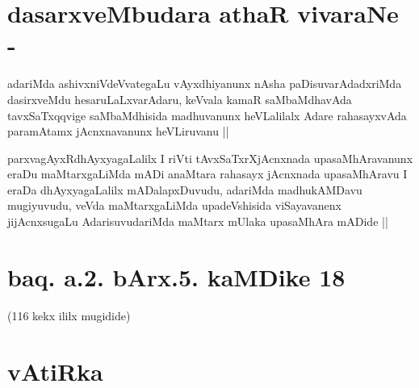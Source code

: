 \section*{dasarxveMbudara athaR vivaraNe -}

\begin{artha}
adariMda ashivxniVdeVvategaLu vAyxdhiyanunx nAsha paDisuvarAdadxriMda
dasirxveMdu hesaruLaLxvarAdaru, keVvala kamaR saMbaMdhavAda
tavxSaTxqqvige saMbaMdhisida madhuvanunx heVLalilalx Adare
rahasayxvAda paramAtamx jAcnxnavanunx heVLiruvanu ||
\end{artha}


\begin{artha}
parxvagAyxRdhAyxyagaLalilx I riVti tAvxSaTxrXjAcnxnada
upasaMhAravanunx eraDu maMtarxgaLiMda mADi anaMtara rahasayx jAcnxnada
upasaMhAravu I eraDa dhAyxyagaLalilx mADalapxDuvudu, adariMda
madhukAMDavu mugiyuvudu, veVda maMtarxgaLiMda upadeVshisida
viSayavanenx jijAcnxsugaLu AdarisuvudariMda maMtarx mUlaka upasaMhAra
mADide ||
\end{artha}

\section*{baq. a.2. bArx.5. kaMDike 18}

\begin{center}
(116 kekx ililx mugidide)
\end{center}

\section*{vAtiRka}
\stext
